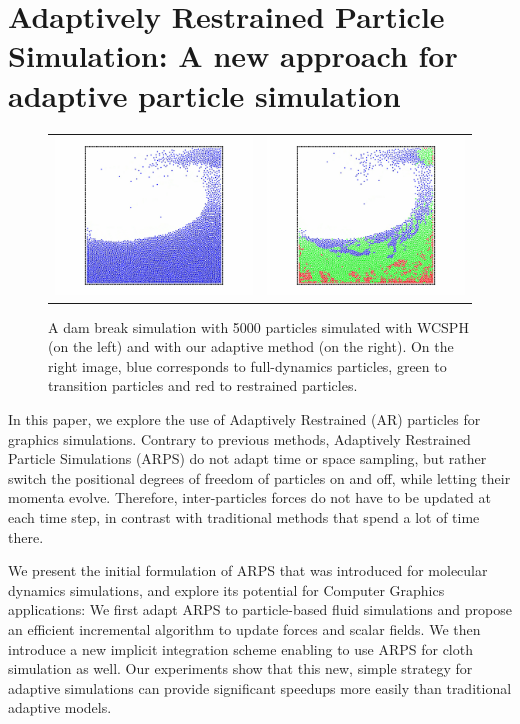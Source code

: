 \chapter{Adaptively Restrained Particle Simulation: A new approach for adaptive particle simulation}
\label{chap:arps}

\begin{figure}[!h]
    \begin{tabular}{cc}
        \includegraphics[width=0.4\linewidth]{images/arps-vriphys2013/ReposSPHClassique1.jpg} &
        \includegraphics[width=0.4\linewidth]{images/arps-vriphys2013/ReposSPHARPSColor1.jpg}
    \end{tabular}
 \centering
 \caption[ARPS: Dam break simulations]{ A dam break simulation with 5000 particles simulated with WCSPH (on the left)
 and with our adaptive method (on the right). On the right image, blue corresponds to full-dynamics particles, green to transition particles and red to restrained particles.}
\label{fig:teaser}
\end{figure}

In this paper, we explore the use of Adaptively Restrained (AR) particles for graphics simulations. Contrary to previous methods,
Adaptively Restrained Particle Simulations (ARPS) do not adapt time or space sampling, but rather switch the positional degrees of freedom of particles on and off, while letting their momenta evolve. Therefore, inter-particles forces do not have to be updated at each time step, in contrast with traditional methods that spend a lot of time there.

We present the initial formulation of ARPS that was introduced for molecular dynamics simulations, and explore its potential for Computer Graphics applications:
We first adapt ARPS to particle-based fluid simulations and propose an efficient incremental algorithm to update forces and scalar fields.
We then introduce a new implicit integration scheme enabling to use ARPS for cloth simulation as well.
Our experiments show that this new, simple strategy for adaptive simulations can provide significant speedups more easily than traditional adaptive models.

